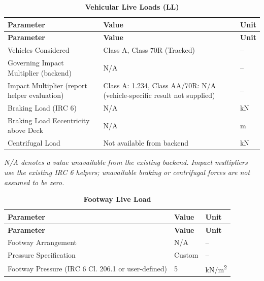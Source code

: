 \documentclass[12pt,a4paper]{report}
\numberwithin{table}{chapter}
\numberwithin{figure}{chapter}
\newcommand{\ReportTableSetup}{%
  \setlength{\tabcolsep}{3.0pt}%
  \renewcommand{\arraystretch}{1.18}%
  \setlength{\arrayrulewidth}{0.4pt}\setlength{\extrarowheight}{0.5pt}%
  \setlength{\LTleft}{\fill}\setlength{\LTright}{\fill}%
  \setlength{\LTpre}{4pt}\setlength{\LTpost}{8pt}}
\newcommand{\ReportTableFont}{\small}
\newcommand{\ReportRowGap}{3.0pt}
\newcommand{\ReportTableGap}{\vspace{0.5em}}
\begin{document}
\ReportTableGap
\begingroup
\ReportTableSetup
\ReportTableFont
\begin{longtable}{|L{6.0000cm}|L{7.0000cm}|L{2.5000cm}|}
\caption{\textbf{Vehicular Live Loads (LL)}}\\
\hline
\textbf{Parameter} & \textbf{Value} & \textbf{Unit} \\
\hline
\endfirsthead
\hline
\textbf{Parameter} & \textbf{Value} & \textbf{Unit} \\
\hline
\endhead
\hline
\endfoot
\hline
\endlastfoot

Vehicles Considered & Class A, Class 70R (Tracked) & -- \\[\ReportRowGap]
\hline
Governing Impact Multiplier (backend) & N/A & -- \\[\ReportRowGap]
\hline
Impact Multiplier (report helper evaluation) & Class A:\allowbreak{} 1.234, Class AA/70R:\allowbreak{} N/A (vehicle-specific result not supplied) & -- \\[\ReportRowGap]
\hline
Braking Load (IRC 6) & N/A & kN \\[\ReportRowGap]
\hline
Braking Load Eccentricity above Deck & N/A & m \\[\ReportRowGap]
\hline
Centrifugal Load & Not available from backend & kN \\[\ReportRowGap]
\hline
\end{longtable}
\endgroup

\noindent\textit{N/A denotes a value unavailable from the existing backend.
Impact multipliers use the existing IRC 6 helpers; unavailable braking or
centrifugal forces are not assumed to be zero.}

\ReportTableGap
\begingroup
\ReportTableSetup
\ReportTableFont
\begin{longtable}{|L{6.0000cm}|L{7.0000cm}|L{2.5000cm}|}
\caption{\textbf{Footway Live Load}}\\
\hline
\textbf{Parameter} & \textbf{Value} & \textbf{Unit} \\
\hline
\endfirsthead
\hline
\textbf{Parameter} & \textbf{Value} & \textbf{Unit} \\
\hline
\endhead
\hline
\endfoot
\hline
\endlastfoot

Footway Arrangement & N/A & -- \\[\ReportRowGap]
\hline
Pressure Specification & Custom & -- \\[\ReportRowGap]
\hline
Footway Pressure (IRC 6 Cl. 206.1 or user-defined) & 5 & kN/m\textsuperscript{2} \\[\ReportRowGap]
\hline
\end{longtable}
\endgroup
\end{document}
